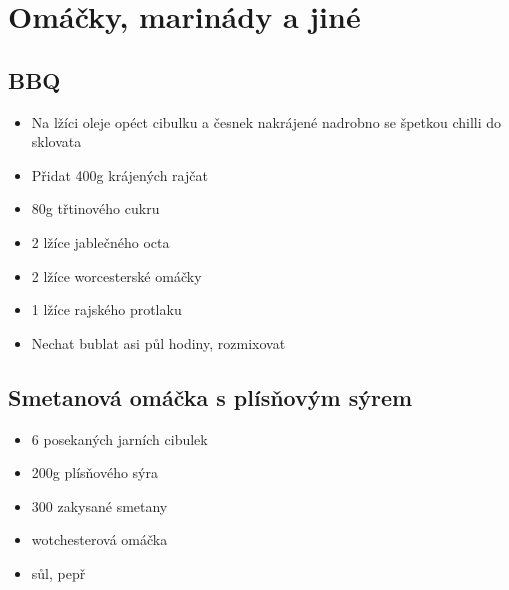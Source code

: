 \documentclass[10pt,a4paper]{article}
\newenvironment{myitemize}
{ \begin{itemize}
    \setlength{\itemsep}{0pt}
    \setlength{\parskip}{0pt}
    \setlength{\parsep}{0pt}     }
{ \end{itemize}                  }
\begin{document}
\section{Omáčky, marinády a jiné}
\subsection{BBQ}
\begin{minipage}[t]{0,5\textwidth}
\begin{myitemize} 
\item Na lžíci oleje opéct cibulku a česnek nakrájené nadrobno se špetkou chilli do sklovata
\item Přidat 400g krájených rajčat
\item 80g třtinového cukru
\item 2 lžíce jablečného octa
\item 2 lžíce worcesterské omáčky
\item 1 lžíce rajského protlaku
\item Nechat bublat asi půl hodiny, rozmixovat
\end{myitemize}
\end{minipage}
\begin{minipage}[t]{0,5\textwidth}

\end{minipage}
\subsection{Smetanová omáčka s plísňovým sýrem}
\begin{minipage}[t]{0,5\textwidth}
\begin{myitemize} 
\item 6 posekaných jarních cibulek
\item 200g plísňového sýra
\item 300 zakysané smetany
\item wotchesterová omáčka
\item sůl, pepř
\end{myitemize}
\end{minipage}
\begin{minipage}[t]{0,5\textwidth}

\end{minipage}
\end{document}
